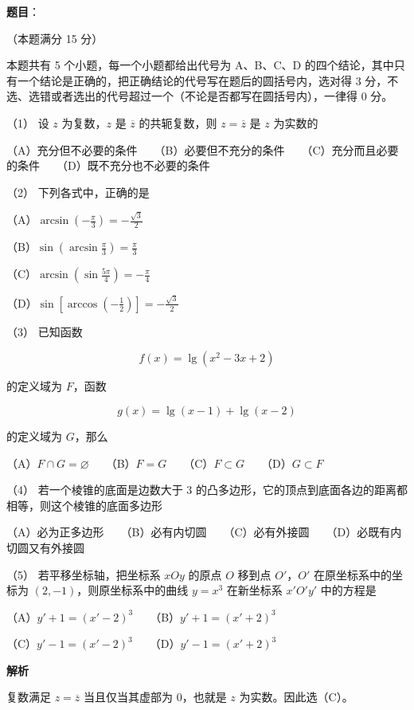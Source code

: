 \begin{answer}

\textbf{题目}：

（本题满分 15 分）

本题共有 5 个小题，每一个小题都给出代号为 A、B、C、D 的四个结论，其中只有一个结论是正确的，把正确结论的代号写在题后的圆括号内，选对得 3 分，不选、选错或者选出的代号超过一个（不论是否都写在圆括号内），一律得 0 分。

（1） 设 $z$ 为复数，$z$ 是 $\overline z$ 的共轭复数，则 $z=\overline z$ 是 $z$ 为实数的

（A）充分但不必要的条件　　（B）必要但不充分的条件　　（C）充分而且必要的条件　　（D）既不充分也不必要的条件

（2） 下列各式中，正确的是

（A）$\arcsin\left(-\frac\pi3\right)=-\frac{\sqrt3}{2}$

（B）$\sin\left(\arcsin\frac\pi3\right)=\frac\pi3$

（C）$\arcsin\left(\sin\frac{5\pi}{4}\right)=-\frac\pi4$

（D）$\sin\left[\arccos\left(-\frac12\right)\right]=-\frac{\sqrt3}{2}$

（3） 已知函数

\nopagebreak[4]
\[
f(x)=\lg(x^2-3x+2)
\]

的定义域为 $F$，函数

\nopagebreak[4]
\[
g(x)=\lg(x-1)+\lg(x-2)
\]

的定义域为 $G$，那么

（A）$F\cap G=\varnothing$　　（B）$F=G$　　（C）$F\subset G$　　（D）$G\subset F$

（4） 若一个棱锥的底面是边数大于 3 的凸多边形，它的顶点到底面各边的距离都相等，则这个棱锥的底面多边形

（A）必为正多边形　　（B）必有内切圆　　（C）必有外接圆　　（D）必既有内切圆又有外接圆

（5） 若平移坐标轴，把坐标系 $xOy$ 的原点 $O$ 移到点 $O'$，$O'$ 在原坐标系中的坐标为 $(2,-1)$，则原坐标系中的曲线 $y=x^3$ 在新坐标系 $x'O'y'$ 中的方程是

（A）$y'+1=(x'-2)^3$　　（B）$y'+1=(x'+2)^3$

（C）$y'-1=(x'-2)^3$　　（D）$y'-1=(x'+2)^3$

\textbf{解析}


复数满足 $z=\overline z$ 当且仅当其虚部为 0，也就是 $z$ 为实数。因此选（C）。


\end{answer}
